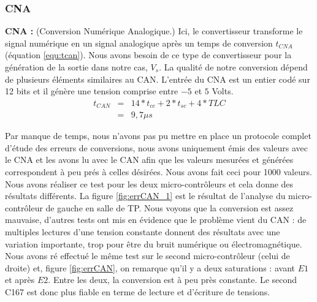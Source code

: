 \subsubsection{CNA}
\hspace{3mm} \textbf{CNA :} (Conversion Numérique Analogique.) Ici, le convertisseur transforme le signal numérique en un signal analogique après un temps de conversion $t_{CNA}$ (équation \ref{equ:tcan}). Nous avons besoin de ce type de convertisseur pour la génération de la sortie dans notre cas, $V_{s}$. La qualité de notre conversion dépend de plusieurs éléments similaires au CAN. L'entrée du CNA est un entier codé sur 12 bits et il génère une tension comprise entre $-5$ et $5$ Volts. 
\begin{eqnarray}
\label{equ:tcan}
t_{CAN} &=& 14*t_{cc} + 2*t_{sc} + 4*TLC \\
&=&  9,7 \mu s%
\end{eqnarray}

Par manque de temps, nous n'avons pas pu mettre en place un protocole complet d'étude des erreurs de conversions, nous avons uniquement émis des valeurs avec le CNA et les avons lu avec le CAN afin que les valeurs mesurées et générées correspondent à peu prés à celles désirées. Nous avons fait ceci pour 1000 valeurs. Nous avons réaliser ce test pour les deux micro-contrôleurs et cela donne des résultats différents. La figure \ref{fig:errCAN_1} est le résultat de l'analyse du micro-contrôleur de gauche en salle de TP. Nous voyons que la conversion est assez mauvaise, d'autres tests ont mis en évidence que le problème vient du CAN : de multiples lectures d'une tension constante donnent des résultats avec une variation importante, trop pour être du bruit numérique ou électromagnétique. Nous avons ré effectué le même test sur le second micro-contrôleur (celui de droite) et, figure \ref{fig:errCAN}, on remarque qu'il y a deux saturations : avant $E1$ et après $E2$. Entre les deux, la conversion est à peu près constante. Le second C167 est donc plus fiable en terme de lecture et d'écriture de tensions.


